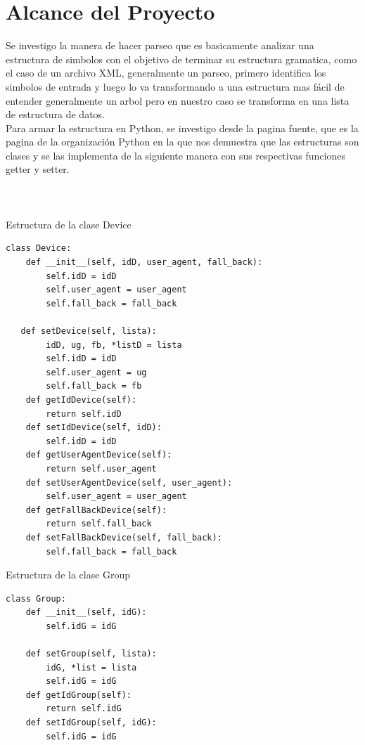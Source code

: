 \documentclass[a4paper,openright,12pt]{report}
\begin{document}
\chapter{Alcance del Proyecto}
Se investigo la manera de hacer parseo que es basicamente analizar una estructura de simbolos con el objetivo de terminar su estructura gramatica, como el
caso de un archivo XML, generalmente un parseo, primero identifica los simbolos de entrada y luego lo va transformando 
a una estructura mas fácil de entender generalmente un arbol pero en nuestro caso se transforma en una lista de estructura de datos.\\

Para armar la estructura en Python, se investigo desde la pagina fuente, que es la pagina de la organización Python en la que nos demuestra que las estructuras son clases y se las implementa de la siguiente manera con sus respectivas funciones getter y setter.\\\\\\\\

\lstset{language=Python}          %
Estructura de la clase Device
\begin{lstlisting}[frame=single]  % Start your code-block
class Device:
    def __init__(self, idD, user_agent, fall_back):
        self.idD = idD
        self.user_agent = user_agent
        self.fall_back = fall_back

   def setDevice(self, lista):
        idD, ug, fb, *listD = lista
        self.idD = idD
        self.user_agent = ug
        self.fall_back = fb
    def getIdDevice(self):
        return self.idD
    def setIdDevice(self, idD):
        self.idD = idD
    def getUserAgentDevice(self):
        return self.user_agent
    def setUserAgentDevice(self, user_agent):
        self.user_agent = user_agent
    def getFallBackDevice(self):
        return self.fall_back
    def setFallBackDevice(self, fall_back):
        self.fall_back = fall_back
\end{lstlisting}

Estructura de la clase Group
\begin{lstlisting}[frame=single]  % Start your code-block
class Group:
    def __init__(self, idG):
        self.idG = idG

    def setGroup(self, lista):
        idG, *list = lista
        self.idG = idG
    def getIdGroup(self):
        return self.idG
    def setIdGroup(self, idG):
        self.idG = idG
\end{lstlisting}
\end{document}
